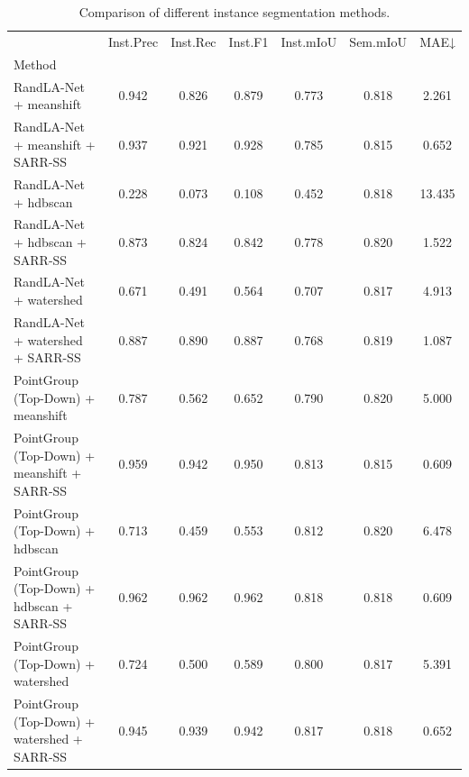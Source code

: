 \begin{table}
\caption{Comparison of different instance segmentation methods.}
\label{tab:comparison}
\begin{tabular}{lcccccc}
\toprule
 & Inst.Prec & Inst.Rec & Inst.F1 & Inst.mIoU & Sem.mIoU & MAE↓ \\
Method &  &  &  &  &  &  \\
\midrule
RandLA-Net + meanshift & 0.942 & 0.826 & 0.879 & 0.773 & 0.818 & 2.261 \\
RandLA-Net + meanshift + SARR-SS & 0.937 & 0.921 & 0.928 & 0.785 & 0.815 & 0.652 \\
RandLA-Net + hdbscan & 0.228 & 0.073 & 0.108 & 0.452 & 0.818 & 13.435 \\
RandLA-Net + hdbscan + SARR-SS & 0.873 & 0.824 & 0.842 & 0.778 & 0.820 & 1.522 \\
RandLA-Net + watershed & 0.671 & 0.491 & 0.564 & 0.707 & 0.817 & 4.913 \\
RandLA-Net + watershed + SARR-SS & 0.887 & 0.890 & 0.887 & 0.768 & 0.819 & 1.087 \\
PointGroup (Top-Down) + meanshift & 0.787 & 0.562 & 0.652 & 0.790 & 0.820 & 5.000 \\
PointGroup (Top-Down) + meanshift + SARR-SS & 0.959 & 0.942 & 0.950 & 0.813 & 0.815 & 0.609 \\
PointGroup (Top-Down) + hdbscan & 0.713 & 0.459 & 0.553 & 0.812 & 0.820 & 6.478 \\
PointGroup (Top-Down) + hdbscan + SARR-SS & 0.962 & 0.962 & 0.962 & 0.818 & 0.818 & 0.609 \\
PointGroup (Top-Down) + watershed & 0.724 & 0.500 & 0.589 & 0.800 & 0.817 & 5.391 \\
PointGroup (Top-Down) + watershed + SARR-SS & 0.945 & 0.939 & 0.942 & 0.817 & 0.818 & 0.652 \\
\bottomrule
\end{tabular}
\end{table}
